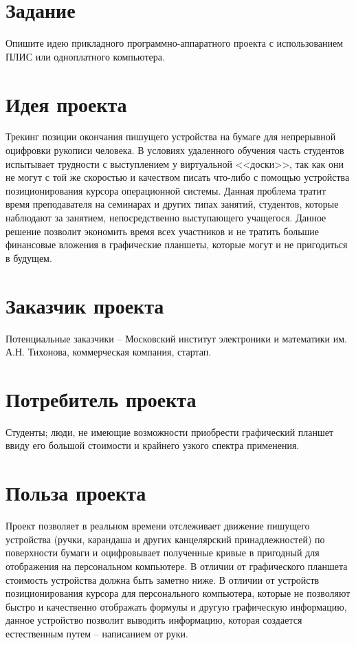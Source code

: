\documentclass[a4paper,14pt]{article}
\begin{document}

\tableofcontents
\pagebreak

\section{Задание}

Опишите идею прикладного программно-аппаратного проекта с использованием ПЛИС или одноплатного компьютера.

\section{Идея проекта}

Трекинг позиции окончания пишущего устройства на бумаге для непрерывной оцифровки рукописи человека.
В условиях удаленного обучения часть студентов испытывает трудности с выступлением у виртуальной <<доски>>, так как они не могут с той же скоростью и качеством писать что-либо с помощью устройства позиционирования курсора операционной системы. Данная проблема тратит время преподавателя на семинарах и других типах занятий, студентов, которые наблюдают за занятием, непосредственно выступающего учащегося.
Данное решение позволит экономить время всех участников и не тратить большие финансовые вложения в графические планшеты, которые могут и не пригодиться в будущем.

\section{Заказчик проекта}

Потенциальные заказчики -- Московский институт электроники и математики им. А.Н. Тихонова, коммерческая компания, стартап.

\section{Потребитель проекта}

Студенты; люди, не имеющие возможности приобрести графический планшет ввиду его большой стоимости и крайнего узкого спектра применения.

\section{Польза проекта}

Проект позволяет в реальном времени отслеживает движение пишущего устройства (ручки, карандаша и других канцелярский принадлежностей) по поверхности бумаги и оцифровывает полученные кривые в пригодный для отображения на персональном компьютере.
В отличии от графического планшета стоимость устройства должна быть заметно ниже.
В отличии от устройств позиционирования курсора для персонального компьютера, которые не позволяют быстро и качественно отображать формулы и другую графическую информацию, данное устройство позволит выводить информацию, которая создается естественным путем -- написанием от руки.
\end{document}
